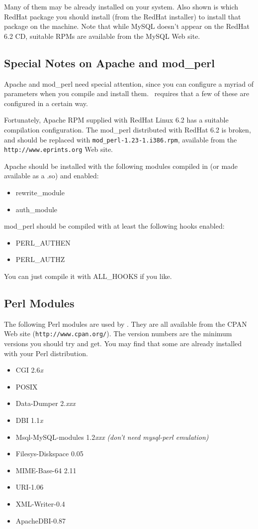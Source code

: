 Many of them may be already installed on your system. Also shown is which RedHat package you should install (from the RedHat installer) to install that package on the machine. Note that while MySQL doesn't appear on the RedHat 6.2 CD, suitable RPMs are available from the MySQL Web site.


\subsection{Special Notes on Apache and mod\_perl}

Apache and mod\_perl need special attention, since you can configure a myriad of parameters when you compile and install them. \eprints\ requires that a few of these are configured in a certain way.

Fortunately, Apache RPM supplied with RedHat Linux 6.2 has a suitable compilation configuration. The mod\_perl distributed with RedHat 6.2 is broken, and should be replaced with {\tt mod\_perl-1.23-1.i386.rpm}, available from the {\tt http://www.eprints.org} Web site.

Apache should be installed with the following modules compiled in (or made available as a .so) and enabled:

\begin{itemize}
\item rewrite\_module
\item auth\_module
\end{itemize}

mod\_perl should be compiled with at least the following hooks enabled:

\begin{itemize}
\item PERL\_AUTHEN
\item PERL\_AUTHZ
\end{itemize}

You can just compile it with ALL\_HOOKS if you like.


\subsection{Perl Modules}

The following Perl modules are used by \eprints. They are all available from the CPAN Web site ({\tt http://www.cpan.org/}). The version numbers are the minimum versions you should try and get. You may find that some are already installed with your Perl distribution.

\begin{itemize}
\item CGI 2.6\emph{x}
\item POSIX
\item Data-Dumper 2.\emph{xxx}
\item DBI 1.1\emph{x}
\item Msql-MySQL-modules 1.2\emph{xxx} \emph{(don't need mysql-perl emulation)}
\item Filesys-Diskspace 0.05
\item MIME-Base-64 2.11
\item URI-1.06
\item XML-Writer-0.4
\item ApacheDBI-0.87
\end{itemize}


